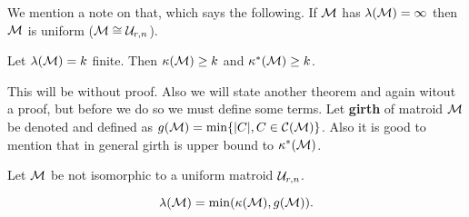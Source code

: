 We mention a note on that, which says the following. If $\mathcal{M}$ has $\lambda(\mathcal{M}) = \infty$ then $\mathcal{M}$ is uniform ($\mathcal{M} \cong \mathcal{U}_{r,n}$).

\begin{prop}
	Let $\lambda(\mathcal{M}) = k$ finite. Then $\kappa(\mathcal{M}) \geq k$ and $\kappa^{\ast} (\mathcal{M}) \geq k$.
\end{prop}

This will be without proof. Also we will state another theorem and again witout a proof, but before we do so we must define some terms. Let \textbf{girth} of matroid $\mathcal{M}$ be denoted and defined as $g(\mathcal{M}) = \min \{|C|, C \in \mathcal{C}(\mathcal{M})\}$. Also it is good to mention that in general girth is upper bound to $\kappa^{\ast}(\mathcal{M})$.

\begin{thm}
	Let $\mathcal{M}$ be not isomorphic to a uniform matroid $\mathcal{U}_{r,n}$.

	$$
	\lambda(\mathcal{M}) = \min(\kappa(\mathcal{M}), g(\mathcal{M})).
	$$
\end{thm}
